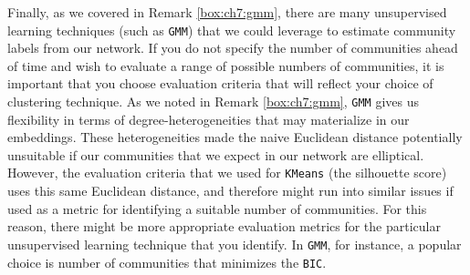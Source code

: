 Finally, as we covered in Remark \ref{box:ch7:gmm}, there are many unsupervised learning techniques (such as \texttt{GMM}) that we could leverage to estimate community labels from our network. If you do not specify the number of communities ahead of time and wish to evaluate a range of possible numbers of communities, it is important that you choose evaluation criteria that will reflect your choice of clustering technique. As we noted in Remark \ref{box:ch7:gmm}, \texttt{GMM} gives us flexibility in terms of degree-heterogeneities that may materialize in our embeddings. These heterogeneities made the naive Euclidean distance potentially unsuitable if our communities that we expect in our network are elliptical. However, the evaluation criteria that we used for \texttt{KMeans} (the silhouette score) uses this same Euclidean distance, and therefore might run into similar issues if used as a metric for identifying a suitable number of communities. For this reason, there might be more appropriate evaluation metrics for the particular unsupervised learning technique that you identify. In \texttt{GMM}, for instance, a popular choice is number of communities that minimizes the \texttt{BIC}.




\newpage